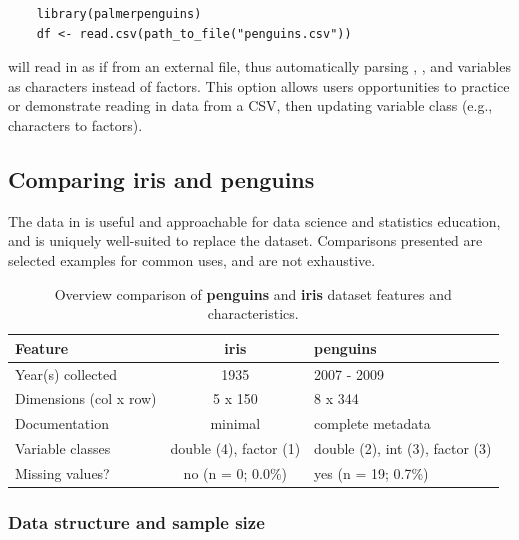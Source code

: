 \begin{verbatim}
    library(palmerpenguins)
    df <- read.csv(path_to_file("penguins.csv"))
\end{verbatim}

will read in  as if from an external file, thus
automatically parsing , , and 
variables as characters instead of factors. This option allows users
opportunities to practice or demonstrate reading in data from a CSV,
then updating variable class (e.g., characters to factors).

\hypertarget{comparing-iris-and-penguins}{%
\subsection{\texorpdfstring{Comparing \textbf{iris} and
\textbf{penguins}}{Comparing iris and penguins}}\label{comparing-iris-and-penguins}}

The  data in  is useful and
approachable for data science and statistics education, and is uniquely
well-suited to replace the  dataset. Comparisons presented
are selected examples for common  uses, and are not
exhaustive.

\begin{Schunk}
\begin{table}

\caption{\label{tab:unnamed-chunk-2}Overview comparison of \textbf{penguins} and \textbf{iris} dataset features and characteristics.}
\centering
\begin{tabular}[t]{lcl}
\toprule
Feature & iris & penguins\\
\midrule
Year(s) collected & 1935 & 2007 - 2009\\
Dimensions (col x row) & 5 x 150 & 8 x 344\\
Documentation & minimal & complete metadata\\
Variable classes & double (4), factor (1) & double (2), int (3), factor (3)\\
Missing values? & no (n = 0; 0.0\%) & yes (n = 19; 0.7\%)\\
\bottomrule
\end{tabular}
\end{table}

\end{Schunk}

\hypertarget{data-structure-and-sample-size}{%
\subsubsection{Data structure and sample
size}\label{data-structure-and-sample-size}}

